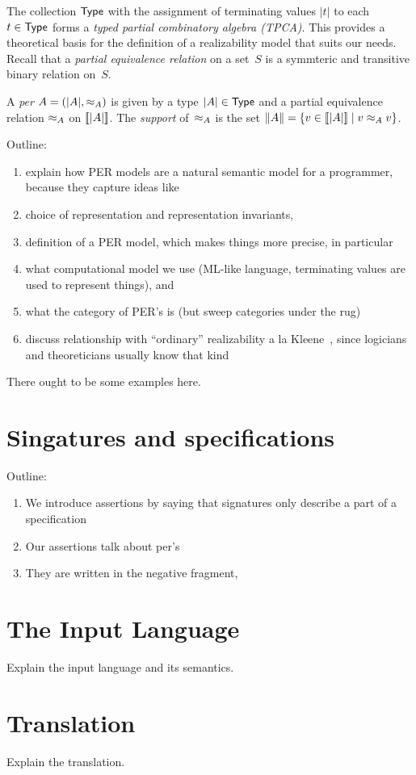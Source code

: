 The collection $\mathsf{Type}$ with the assignment of terminating values $|t|$
to each $t \in \mathsf{Type}$ forms a \emph{typed partial combinatory algebra
  (TPCA)}. This provides a theoretical basis for the definition of a
realizability model that suits our needs. Recall that a \emph{partial
  equivalence relation} on a set~$S$ is a symmteric and transitive
binary relation on~$S$.

\begin{definition}
  A \emph{per} $A = (|A|, {\approx_A})$ is given by a type
  $|A| \in \mathsf{Type}$ and a partial equivalence relation $\approx_A$
  on $[\![|A|]\!]$. The \emph{support} of~$\approx_A$ is the
  set $\|A\| = \{v \in [\![|A|]\!] \mid v
    \approx_A v\}$.
\end{definition}



\bigskip\bigskip


Outline:
%
\begin{enumerate}
\item explain how PER models are a natural semantic model for a
  programmer, because they capture ideas like
\item choice of representation and representation invariants,
\item definition of a PER model, which makes things more precise, in
  particular
\item what computational model we use (ML-like language, terminating
  values are used to represent things), and
\item what the category of PER's is (but sweep categories under the
  rug)
\item discuss relationship with ``ordinary'' realizability a la
  Kleene~\cite{KleeneSC:intint}, since logicians and theoreticians
  usually know that kind
\end{enumerate}

There ought to be some examples here.

\section{Singatures and specifications}
\label{sec:sing-spec}

Outline:
%
\begin{enumerate}
\item We introduce assertions by saying that signatures only describe a
  part of a specification
\item Our assertions talk about per's
\item They are written in the negative fragment,
\end{enumerate}


\section{The Input Language}
\label{sec:input-language}

Explain the input language and its semantics.

\section{Translation}
\label{sec:translation}

Explain the translation.





